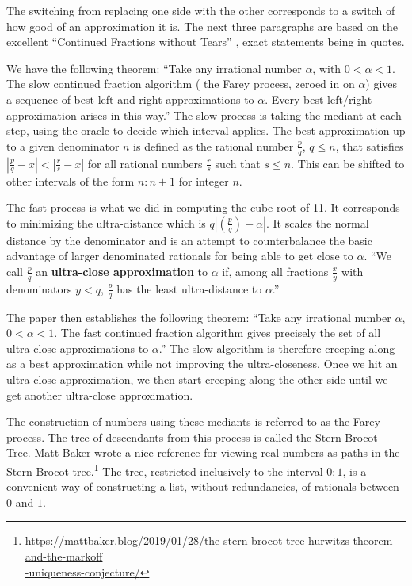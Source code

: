 \documentclass[12pt]{article}
\theoremstyle{remark}
\begin{document}
The switching from replacing one side with the other corresponds to a switch of how good of an approximation it is. The next three paragraphs are based on the excellent ``Continued Fractions without Tears'' \cite{richards}, exact statements being in quotes.  

We have the following theorem: ``Take any irrational number $\alpha$, with $0 < \alpha < 1$. The slow continued fraction algorithm ( the Farey process, zeroed in on $\alpha$) gives a sequence of best left and right approximations to $\alpha$. Every best left/right approximation arises in this way.'' The slow process is taking the mediant at each step, using the oracle to decide which interval applies. The best approximation up to a given denominator $n$ is defined as the rational number $\frac{p}{q}$, $q  \leq n$, that satisfies $|\frac{p}{q} - x | < |\frac{r}{s} -x|$ for all rational numbers $\frac{r}{s}$ such that $s \leq n$. This can be shifted to other intervals of the form $n:n+1$ for integer $n$.

The fast process is what we did in computing the cube root of 11. It corresponds to minimizing the ultra-distance which is $q|(\frac{p}{q})-\alpha|$. It scales the normal distance by the denominator and is an attempt to counterbalance the basic advantage of larger denominated rationals for being able to get close to $\alpha$.  ``We call $\frac{p}{q}$ an \textbf{ultra-close approximation} to $\alpha$ if, among all fractions $\frac{x}{y}$ with denominators $y < q$, $\frac{p}{q}$ has the least ultra-distance to $\alpha$.''

The paper then establishes the following theorem: ``Take any irrational number $\alpha$, $0 < \alpha < 1$. The fast continued fraction algorithm gives precisely the set of all ultra-close approximations to $\alpha$.''  The slow algorithm is therefore creeping along as a best approximation while not improving the ultra-closeness. Once we hit an ultra-close approximation, we then start creeping along the other side until we get another ultra-close approximation. 

The construction of numbers using these mediants is referred to as the Farey process. The tree of descendants from this process is called the Stern-Brocot Tree. Matt Baker wrote a nice reference for viewing real numbers as paths in the Stern-Brocot tree.\footnote{{\href{https://mattbaker.blog/2019/01/28/the-stern-brocot-tree-hurwitzs-theorem-and-the-markoff-uniqueness-conjecture/}{https://mattbaker.blog/2019/01/28/the-stern-brocot-tree-hurwitzs-theorem-and-the-markoff} \\ \hspace*{10px}  \href{https://mattbaker.blog/2019/01/28/the-stern-brocot-tree-hurwitzs-theorem-and-the-markoff-uniqueness-conjecture/}{-uniqueness-conjecture/} }} The tree, restricted inclusively to the interval $0:1$, is a convenient way of constructing a list, without redundancies, of rationals between $0$ and $1$. 
\end{document}
